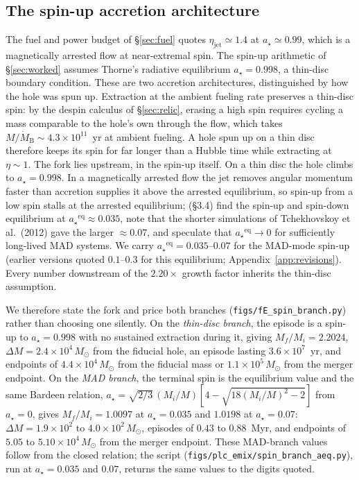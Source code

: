 \documentclass[11pt]{article}
\newcommand{\msun}{\ensuremath{M_\odot}}
\newcommand{\astar}{\ensuremath{a_\star}}
\begin{document}
\subsection{The spin-up accretion architecture}
\label{sec:spinbranch}

The fuel and power budget of \S\ref{sec:fuel} quotes $\eta_{\mathrm{jet}} \simeq 1.4$ at $\astar \simeq 0.99$, which is a magnetically arrested flow at near-extremal spin. The spin-up arithmetic of \S\ref{sec:worked} assumes Thorne's radiative equilibrium $\astar = 0.998$, a thin-disc boundary condition. These are two accretion architectures, distinguished by how the hole was spun up. Extraction at the ambient fueling rate preserves a thin-disc spin: by the despin calculus of \S\ref{sec:relic}, erasing a high spin requires cycling a mass comparable to the hole's own through the flow, which takes $M/\dot{M}_{\mathrm{B}} \sim 4.3\times10^{11}$~yr at ambient fueling. A hole spun up on a thin disc therefore keeps its spin for far longer than a Hubble time while extracting at $\eta \sim 1$. The fork lies upstream, in the spin-up itself. On a thin disc the hole climbs to $\astar = 0.998$. In a magnetically arrested flow the jet removes angular momentum faster than accretion supplies it above the arrested equilibrium, so spin-up from a low spin stalls at the arrested equilibrium; \citet{Narayan2022} (\S3.4) find the spin-up and spin-down equilibrium at $\astar^{\mathrm{eq}} \approx 0.035$, note that the shorter simulations of Tchekhovskoy et al.\ (2012) gave the larger $\approx 0.07$, and speculate that $\astar^{\mathrm{eq}} \to 0$ for sufficiently long-lived MAD systems. We carry $\astar^{\mathrm{eq}} = 0.035$--$0.07$ for the MAD-mode spin-up (earlier versions quoted $0.1$--$0.3$ for this equilibrium; Appendix~\ref{app:revisions}). Every number downstream of the $2.20\times$ growth factor inherits the thin-disc assumption.

We therefore state the fork and price both branches (\texttt{figs/fE\_spin\_branch.py}) rather than choosing one silently. On the \emph{thin-disc branch}, the episode is a spin-up to $\astar = 0.998$ with no sustained extraction during it, giving $M_{f}/M_{i} = 2.2024$, $\Delta M = 2.4\times10^{4}\,\msun$ from the fiducial hole, an episode lasting $3.6\times10^{7}$~yr, and endpoints of $4.4\times10^{4}\,\msun$ from the fiducial mass or $1.1\times10^{5}\,\msun$ from the merger endpoint. On the \emph{MAD branch}, the terminal spin is the equilibrium value and the same Bardeen relation, $\astar = \sqrt{2/3}\,(M_{i}/M)\left[4 - \sqrt{18(M_{i}/M)^{2} - 2}\right]$ from $\astar = 0$, gives $M_{f}/M_{i} = 1.0097$ at $\astar = 0.035$ and $1.0198$ at $\astar = 0.07$: $\Delta M = 1.9\times10^{2}$ to $4.0\times10^{2}\,\msun$, episodes of $0.43$ to $0.88$~Myr, and endpoints of $5.05$ to $5.10\times10^{4}\,\msun$ from the merger endpoint. These MAD-branch values follow from the closed relation; the script (\texttt{figs/plc\_emix/spin\_branch\_aeq.py}), run at $\astar = 0.035$ and $0.07$, returns the same values to the digits quoted.
\end{document}
